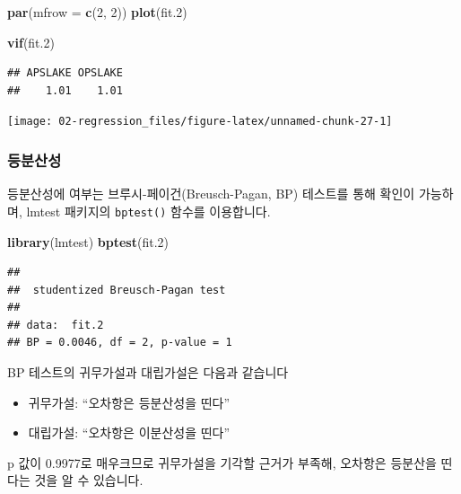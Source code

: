 \documentclass[12pt,]{book}
\newenvironment{Shaded}{\begin{snugshade}}{\end{snugshade}}
\newcommand{\DataTypeTok}[1]{\textcolor[rgb]{0.13,0.29,0.53}{#1}}
\newcommand{\DecValTok}[1]{\textcolor[rgb]{0.00,0.00,0.81}{#1}}
\newcommand{\FloatTok}[1]{\textcolor[rgb]{0.00,0.00,0.81}{#1}}
\newcommand{\KeywordTok}[1]{\textcolor[rgb]{0.13,0.29,0.53}{\textbf{#1}}}
\newcommand{\NormalTok}[1]{#1}
\providecommand{\tightlist}{%
  \setlength{\itemsep}{0pt}\setlength{\parskip}{0pt}}
\begin{document}
\begin{Shaded}
\begin{Highlighting}[]
\KeywordTok{par}\NormalTok{(}\DataTypeTok{mfrow =} \KeywordTok{c}\NormalTok{(}\DecValTok{2}\NormalTok{, }\DecValTok{2}\NormalTok{))}
\KeywordTok{plot}\NormalTok{(fit}\FloatTok{.2}\NormalTok{)}

\KeywordTok{vif}\NormalTok{(fit}\FloatTok{.2}\NormalTok{)}
\end{Highlighting}
\end{Shaded}

\begin{verbatim}
## APSLAKE OPSLAKE 
##    1.01    1.01
\end{verbatim}

\begin{center}\texttt{[image: 02-regression\_files/figure-latex/unnamed-chunk-27-1]} \end{center}

\hypertarget{uxb4f1uxbd84uxc0b0uxc131}{%
\subsubsection{등분산성}\label{uxb4f1uxbd84uxc0b0uxc131}}

등분산성에 여부는 브루시-페이건(Breusch-Pagan, BP) 테스트를 통해 확인이 가능하며, lmtest 패키지의 \texttt{bptest()} 함수를 이용합니다.

\begin{Shaded}
\begin{Highlighting}[]
\KeywordTok{library}\NormalTok{(lmtest)}
\KeywordTok{bptest}\NormalTok{(fit}\FloatTok{.2}\NormalTok{)}
\end{Highlighting}
\end{Shaded}

\begin{verbatim}
## 
##  studentized Breusch-Pagan test
## 
## data:  fit.2
## BP = 0.0046, df = 2, p-value = 1
\end{verbatim}

BP 테스트의 귀무가설과 대립가설은 다음과 같습니다

\begin{itemize}
\tightlist
\item
  귀무가설: ``오차항은 등분산성을 띤다''
\item
  대립가설: ``오차항은 이분산성을 띤다''
\end{itemize}

p 값이 0.9977로 매우크므로 귀무가설을 기각할 근거가 부족해, 오차항은 등분산을 띤다는 것을 알 수 있습니다.
\end{document}
